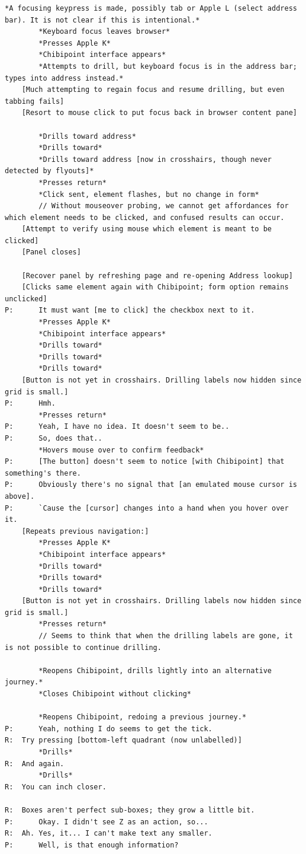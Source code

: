\documentclass[11pt,openright,a4paper]{report}
\begin{document}
\begin{lstlisting}[caption={Transcript of Usability Study}, label={lst:usabilityTrans}, style=basic, language=custom, flexiblecolumns=true]
		*A focusing keypress is made, possibly tab or Apple L (select address bar). It is not clear if this is intentional.*
		*Keyboard focus leaves browser*
		*Presses Apple K*
		*Chibipoint interface appears*
		*Attempts to drill, but keyboard focus is in the address bar; types into address instead.*
	[Much attempting to regain focus and resume drilling, but even tabbing fails]
	[Resort to mouse click to put focus back in browser content pane]

		*Drills toward address*
		*Drills toward*
		*Drills toward address [now in crosshairs, though never detected by flyouts]*
		*Presses return*
		*Click sent, element flashes, but no change in form*
		// Without mouseover probing, we cannot get affordances for which element needs to be clicked, and confused results can occur.
	[Attempt to verify using mouse which element is meant to be clicked]
	[Panel closes]

	[Recover panel by refreshing page and re-opening Address lookup]
	[Clicks same element again with Chibipoint; form option remains unclicked]
P:		It must want [me to click] the checkbox next to it.
		*Presses Apple K*
		*Chibipoint interface appears*
		*Drills toward*
		*Drills toward*
		*Drills toward*
	[Button is not yet in crosshairs. Drilling labels now hidden since grid is small.]
P:		Hmh.
		*Presses return*
P:		Yeah, I have no idea. It doesn't seem to be..
P:		So, does that..
		*Hovers mouse over to confirm feedback*
P:		[The button] doesn't seem to notice [with Chibipoint] that something's there.
P:		Obviously there's no signal that [an emulated mouse cursor is above].
P:		`Cause the [cursor] changes into a hand when you hover over it.
	[Repeats previous navigation:]
		*Presses Apple K*
		*Chibipoint interface appears*
		*Drills toward*
		*Drills toward*
		*Drills toward*
	[Button is not yet in crosshairs. Drilling labels now hidden since grid is small.]
		*Presses return*
		// Seems to think that when the drilling labels are gone, it is not possible to continue drilling.

		*Reopens Chibipoint, drills lightly into an alternative journey.*
		*Closes Chibipoint without clicking*

		*Reopens Chibipoint, redoing a previous journey.*
P:		Yeah, nothing I do seems to get the tick.
R:	Try pressing [bottom-left quadrant (now unlabelled)]
		*Drills*
R:	And again.
		*Drills*
R:	You can inch closer.

R:	Boxes aren't perfect sub-boxes; they grow a little bit.
P:		Okay. I didn't see Z as an action, so...
R:	Ah. Yes, it... I can't make text any smaller.
P:		Well, is that enough information?






\end{lstlisting}
\end{document}
